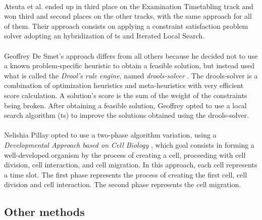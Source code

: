 \\
Atsuta et al. ended up in third place on the Examination Timetabling track and won third and second places on the other tracks, with the same approach for all of them. Their approach \cite{Atsuta2007} consists on applying a constraint satisfaction problem solver adopting an hybridization of \gls{ts} and Iterated Local Search.\\
\\
Geoffrey De Smet's approach \cite{Smet2007} differs from all others because he decided not to use a known problem-specific heuristic to obtain a feasible solution, but instead used what is called the \textit{Drool's rule engine}, named \textit{drools-solver} \cite{Drools}. The drools-solver is a combination of optimization heuristics and meta-heuristics with very efficient score calculation. A solution's score is the sum of the weight of the constraints being broken. After obtaining a feasible solution, Geoffrey opted to use a local search algorithm (\gls{ts}) to improve the solutions obtained using the drools-solver.\\
\\
Nelishia Pillay opted to use a two-phase algorithm variation, using a \textit{Developmental Approach based on Cell Biology} \cite{Pillay2007}, which goal consists in forming a well-developed organism by the process of creating a cell, proceeding with cell division, cell interaction, and cell migration. In this approach, each cell represents a time slot. The first phase represents the process of creating the first cell, cell division and cell interaction. The second phase represents the cell migration.

\subsection{Other methods}
\label{subsection:OtherAppr}

